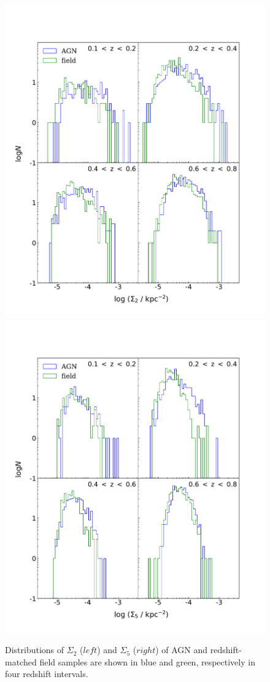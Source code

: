 \begin{figure}
\hspace*{-50pt}
   \includegraphics[width=0.6\columnwidth]{plots_chp2/random_env_2_histogram.pdf}
   \includegraphics[width=0.6\columnwidth]{plots_chp2/random_env_5_histogram.pdf}
   \caption[Sample (i): $\Sigma_2$ and $\Sigma_5$ histograms]{Distributions of $\Sigma_2$ ($left$) and $\Sigma_5$ ($right$) of AGN and redshift-matched field samples are shown in blue and green, respectively in four redshift intervals.}
   \label{fig:random-env_L_radio_hist}
 \end{figure}

